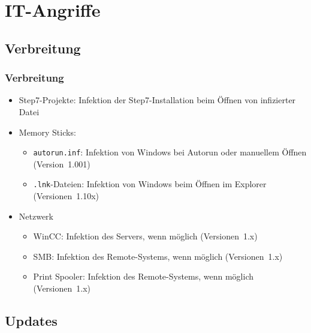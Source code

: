 \documentclass{beamer}
\begin{document}
\section{IT-Angriffe}

\subsection{Verbreitung}

\begin{frame}
  \frametitle{Verbreitung}
  \begin{itemize}
    \item Step7-Projekte: Infektion der Step7-Installation beim Öffnen von infizierter Datei
    \item Memory Sticks:
      \begin{itemize}
        \item \texttt{autorun.inf}: Infektion von Windows bei Autorun oder manuellem Öffnen (Version~1.001)
        \item \texttt{.lnk}-Dateien: Infektion von Windows beim Öffnen im Explorer (Versionen~1.10x)
      \end{itemize}
    \item Netzwerk
      \begin{itemize}
        \item WinCC: Infektion des Servers, wenn möglich (Versionen~1.x)
        \item SMB: Infektion des Remote-Systems, wenn möglich (Versionen~1.x)
        \item Print Spooler: Infektion des Remote-Systems, wenn möglich (Versionen~1.x)
      \end{itemize}
  \end{itemize}
\end{frame}

\subsection{Updates}
\end{document}
